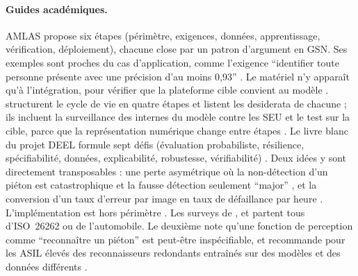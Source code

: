 \paragraph{Guides académiques.} AMLAS
\citep{arxiv-2102.01564-guidance-assurance-machine-learning-autonomous}\pp{} propose six
étapes (périmètre, exigences, données, apprentissage, vérification, déploiement), chacune
close par un patron d'argument en GSN. Ses exemples sont proches du cas d'application,
comme l'exigence \enquote{identifier toute personne présente avec une précision d'au moins
0,93} . Le matériel n'y apparaît qu'à l'intégration, pour vérifier que la
plateforme cible convient au modèle .
\citet{arxiv-1905.04223-assuring-machine-learning-lifecycle-desiderata}\pp{} structurent le
cycle de vie en quatre étapes et listent les desiderata de chacune ; ils incluent la surveillance des internes du modèle contre les SEU  et le test sur
la cible, parce que la représentation numérique change entre étapes . Le livre
blanc du projet DEEL \citep{arxiv-2103.10529-white-paper-machine-learning-certified}\pp{}
formule sept défis (évaluation probabiliste, résilience, spécifiabilité, données,
explicabilité, robustesse, vérifiabilité) . Deux idées y sont directement
transposables : une perte asymétrique où la non-détection d'un piéton est catastrophique et
la fausse détection seulement \enquote{major} , et la conversion d'un taux
d'erreur par image en taux de défaillance par heure . L'implémentation est
hors périmètre . Les surveys de
\citet{2020-schwalbe-survey-methods-safety-assurance-machine},
\citet{arxiv-1709.02435-analysis-iso-26262-machine-learning}\pp{} et
\citet{arxiv-1812.08342-survey-safety-trustworthiness-deep-neural}\pp{} partent tous
d'ISO~26262 ou de l'automobile. Le deuxième note qu'une fonction de perception comme
\enquote{reconnaître un piéton} est peut-être inspécifiable, et recommande pour les ASIL
élevés des reconnaisseurs redondants entraînés sur des modèles et des données différents
.

